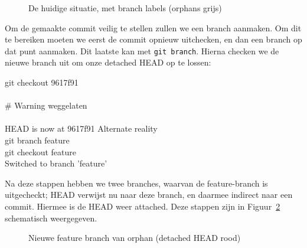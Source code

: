 \begin{figure}[ht]
\label{fig:branches}
\caption{De huidige situatie, met branch labels (orphans grijs)}
\end{figure}

Om de gemaakte commit veilig te stellen zullen we een branch aanmaken. Om dit te bereiken moeten we eerst de commit opnieuw uitchecken, en dan een branch op dat punt aanmaken. Dit laatste kan met \texttt{git branch}. Hierna checken we de nieuwe branch uit om onze detached HEAD op te lossen:

\begin{bash}
 git checkout 9617f91\\
~ \\
\# Warning weggelaten \\
~ \\
HEAD is now at 9617f91 Alternate reality\\
 git branch feature\\
 git checkout feature\\
Switched to branch 'feature'
\end{bash}

 Na deze stappen hebben we twee branches, waarvan de feature-branch is uitgecheckt; HEAD verwijst nu naar deze branch, en daarmee indirect naar een commit. Hiermee is de HEAD weer attached. Deze stappen zijn in Figuur~\ref{fig:fix} schematisch weergegeven.

\begin{figure}[ht]
\label{fig:fix}
\caption{Nieuwe feature branch van orphan (detached HEAD rood)}
\end{figure}

